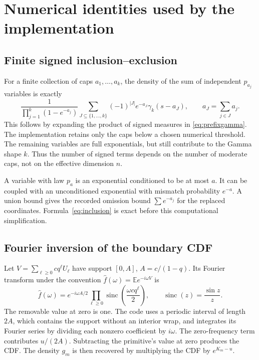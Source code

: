 \documentclass[11pt,a4paper]{article}
\numberwithin{equation}{section}
\theoremstyle{definition}
\theoremstyle{remark}
\newcommand{\E}{\mathbb E}
\begin{document}
\appendix
\section{Numerical identities used by the implementation}
\label{app:numerics}

\subsection{Finite signed inclusion--exclusion}
For a finite collection of caps $a_1,\ldots,a_k$, the density of the sum
of independent $p_{a_j}$ variables is exactly
\begin{equation}\label{eq:inclusion}
\frac1{\prod_{j=1}^k(1-e^{-a_j})}
\sum_{J\subseteq\{1,\ldots,k\}}(-1)^{|J|}e^{-a_J}
                  \gamma_k(s-a_J),\qquad
 a_J=\sum_{j\in J}a_j.
\end{equation}
This follows by expanding the product of signed measures in
\eqref{eq:prefixgamma}. The implementation retains only the caps below
a chosen numerical threshold. The remaining variables are full
exponentials, but still contribute to the Gamma shape $k$. Thus the
number of signed terms depends on the number of moderate caps, not
on the effective dimension $n$.

A variable with law $p_a$ is an exponential conditioned to be at most
$a$. It can be coupled with an unconditioned exponential with mismatch
probability $e^{-a}$. A union bound gives the recorded omission bound
$\sum e^{-a_j}$ for the replaced coordinates. Formula~\eqref{eq:inclusion}
is exact before this computational simplification.

\subsection{Fourier inversion of the boundary CDF}
Let $V=\sum_{\ell\ge0}cq^\ell U_\ell$ have support
$[0,A]$, $A=c/(1-q)$. Its Fourier transform under the convention
$\widehat f(\omega)=\E e^{-i\omega V}$ is
\begin{equation}\label{eq:fourier}
\widehat f(\omega)
 =e^{-i\omega A/2}\prod_{\ell\ge0}
       \operatorname{sinc}\!\left(\frac{\omega cq^\ell}{2}\right),
\qquad \operatorname{sinc}(z)=\frac{\sin z}{z}.
\end{equation}
The removable value at zero is one. The code uses a periodic interval
of length $2A$, which contains the support without an interior wrap,
and integrates its Fourier series by dividing each nonzero coefficient
by $i\omega$. The zero-frequency term contributes $u/(2A)$.
Subtracting the primitive's value at zero produces the CDF. The density
$g_m$ is then recovered by multiplying the CDF by $e^{K_m-u}$.
\end{document}
